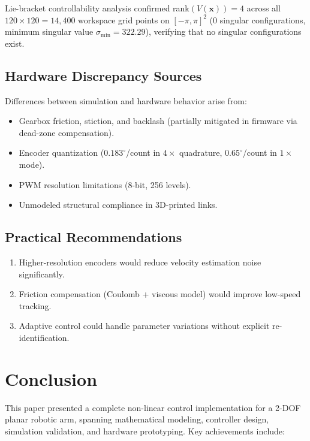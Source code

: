 \documentclass[conference]{IEEEtran}
\begin{document}
Lie-bracket controllability analysis confirmed rank$(V(\mathbf{x})) = 4$ across all $120 \times 120 = 14{,}400$ workspace grid points on $[-\pi, \pi]^2$ (0 singular configurations, minimum singular value $\sigma_{\min} = 322.29$), verifying that no singular configurations exist.

\subsection{Hardware Discrepancy Sources}

Differences between simulation and hardware behavior arise from:
\begin{itemize}
\item Gearbox friction, stiction, and backlash (partially mitigated in firmware via dead-zone compensation).
\item Encoder quantization ($0.183^{\circ}$/count in $4\times$ quadrature, $0.65^{\circ}$/count in $1\times$ mode).
\item PWM resolution limitations (8-bit, 256 levels).
\item Unmodeled structural compliance in 3D-printed links.
\end{itemize}

\subsection{Practical Recommendations}

\begin{enumerate}
\item Higher-resolution encoders would reduce velocity estimation noise significantly.
\item Friction compensation (Coulomb + viscous model) would improve low-speed tracking.
\item Adaptive control could handle parameter variations without explicit re-identification.
\end{enumerate}

\section{Conclusion}
\label{sec:conclusion}

This paper presented a complete non-linear control implementation for a 2-DOF planar robotic arm, spanning mathematical modeling, controller design, simulation validation, and hardware prototyping. Key achievements include:
\end{document}
